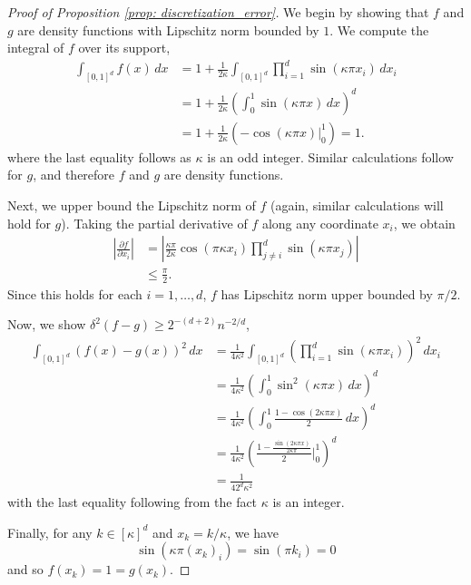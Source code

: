 \documentclass{article}
\newcommand{\abs}[1]{\left \lvert #1 \right \rvert}
\newcommand{\1}{\mathbb{I}}
\newcommand{\dx}{\,dx}
\theoremstyle{alden}
\theoremstyle{aldenthm}
\theoremstyle{definition}
\theoremstyle{remark}
\begin{document}
\begin{proof}[Proof of Proposition \ref{prop: discretization_error}]
	We begin by showing that $f$ and $g$ are density functions with Lipschitz norm bounded by $1$. We compute the integral of $f$ over its support,
	\begin{align*}
	\int_{[0,1]^d} f(x) \dx & = 1 + \frac{1}{2\kappa} \int_{[0,1]^d} \prod_{i = 1}^{d} \sin(\kappa \pi x_i) \dx_i \\
	& = 1 + \frac{1}{2\kappa} \left(\int_{0}^{1} \sin(\kappa \pi x) \dx\right)^d \\
	& = 1 + \frac{1}{2 \kappa} \left(-\cos(\kappa \pi x) \Bigr|_{0}^{1}\right) = 1.
	\end{align*}
	where the last equality follows as $\kappa$ is an odd integer. Similar calculations follow for $g$, and therefore $f$ and $g$ are density functions.
	
	Next, we upper bound the Lipschitz norm of $f$ (again, similar calculations will hold for $g$). Taking the partial derivative of $f$ along any coordinate $x_i$, we obtain
	\begin{align*}
	\abs{\frac{\partial f}{\partial x_i}} & = \abs{\frac{\kappa \pi}{2 \kappa} \cos(\pi \kappa x_i) \prod_{j \neq i}^{d} \sin(\kappa \pi x_j)} \\
	& \leq \frac{\pi}{2}.
	\end{align*}
	Since this holds for each $i = 1, \ldots, d$, $f$ has Lipschitz norm upper bounded by $\pi/2$. 
	
	Now, we show $\delta^2(f - g) \geq 2^{-(d + 2)} n^{-2/d}$,
	\begin{align*}
	\int_{[0,1]^d} (f(x) - g(x))^2 \dx & = \frac{1}{4 \kappa^2} \int_{[0,1]^d} \left(\prod_{i = 1}^{d} \sin(\kappa \pi x_i)\right)^2 \dx_i \\
	& = \frac{1}{4\kappa^2} \left( \int_{0}^{1} \sin^2(\kappa \pi x) \dx \right)^d \\
	& = \frac{1}{4\kappa^2} \left( \int_{0}^{1} \frac{1 - \cos(2 \kappa \pi x)}{2} \dx \right)^d \\ 
	& = \frac{1}{4\kappa^2} \left(\frac{1 - \frac{\sin(2 \kappa \pi x)}{2 \kappa \pi}}{2} \biggr|_{0}^{1} \right)^d \\
	& = \frac{1}{4 2^d \kappa^2}
	\end{align*}
	with the last equality following from the fact $\kappa$ is an integer.
	
	Finally, for any $k \in [\kappa]^d$ and $x_k = k/\kappa$, we have
	\begin{equation*}
	\sin(\kappa \pi (x_k)_i) = \sin(\pi k_i) = 0
	\end{equation*}
	and so $f(x_k) = 1 = g(x_k)$. 
\end{proof}
\end{document}
